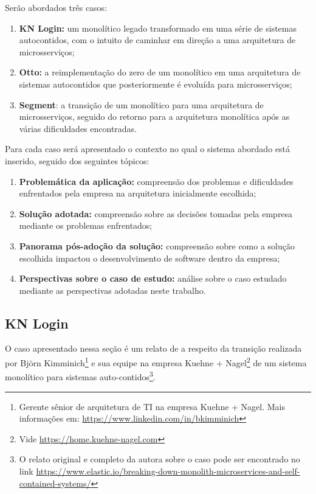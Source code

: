 Serão abordados três casos:

\begin{enumerate}
    \item \textbf{KN Login:} um monolítico legado transformado em uma série de sistemas autocontidos, com o
        intuito de caminhar em direção a uma arquitetura de microsserviços;
    \item \textbf{Otto:} a reimplementação do zero de um monolítico em uma arquitetura de sistemas
        autocontidos que posteriormente é evoluída para microsserviços;
    \item \textbf{Segment}: a transição de um monolítico para uma arquitetura de microsserviços,
        seguido do retorno para a arquitetura monolítica após as várias dificuldades encontradas.
\end{enumerate}

Para cada caso será apresentado o contexto no qual o sistema abordado está inserido, seguido dos
seguintes tópicos:

\begin{enumerate}
    \item \textbf{Problemática da aplicação:} compreensão dos problemas e dificuldades enfrentados
        pela empresa na arquitetura inicialmente escolhida;
    \item \textbf{Solução adotada:} compreensão sobre as decisões tomadas pela empresa mediante os
        problemas enfrentados;
    \item \textbf{Panorama pós-adoção da solução:} compreensão sobre como a solução escolhida
        impactou o desenvolvimento de software dentro da empresa;
    \item \textbf{Perspectivas sobre o caso de estudo:} análise sobre o caso estudado mediante as
        perspectivas adotadas neste trabalho.
\end{enumerate}

\subsection{KN Login}
\label{sec:KNLogin}

O caso apresentado nessa seção é um relato de  a respeito
da transição realizada por Björn Kimminich\footnote{Gerente sênior de arquitetura de TI na empresa
Kuehne + Nagel. Mais informações em: \url{https://www.linkedin.com/in/bkimminich}} e sua equipe na empresa
Kuehne + Nagel\footnote{Vide \url{https://home.kuehne-nagel.com}} de um sistema monolítico para sistemas
auto-contidos\footnote{O relato original e completo da autora sobre o caso pode ser encontrado no link
\url{https://www.elastic.io/breaking-down-monolith-microservices-and-self-contained-systems/}}. 

